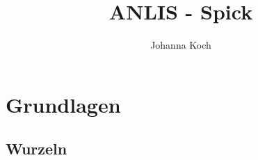 \documentclass{report}
\title{ANLIS - Spick}
\author{Johanna Koch}
\date{ }
\begin{document}
\maketitle
\tableofcontents


\iffalse
\begin{tabular}{ |c| }
    \hline
    \begin{math}
        \sqrt{x} =  x^\frac{1}{2}
    \end{math}
    \\
    \hline
    \begin{math}
        \sqrt[3]{x} = x^\frac{1}{3}
    \end{math}
    \\
    \hline
\end{tabular}
\fi

\iffalse
\begin{tabularx}{1\textwidth} { 
    >{\centering\arraybackslash}X 
    >{\centering\arraybackslash}X  }
    \begin{math}
        {}
    \end{math}
    &
    \begin{math}
        {}
    \end{math}
    \\ [7pt]
    \begin{math}
        {}
    \end{math}
    &
    \begin{math}
        {}
    \end{math}
    \\ [7pt]
\end{tabularx}
\fi

\chapter{Grundlagen}

\section{Wurzeln}
\end{document}
